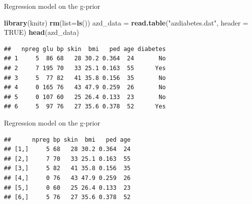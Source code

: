 \documentclass[ignorenonframetext,]{beamer}
\newenvironment{Shaded}{\begin{snugshade}}{\end{snugshade}}
\newcommand{\KeywordTok}[1]{\textcolor[rgb]{0.13,0.29,0.53}{\textbf{#1}}}
\newcommand{\DataTypeTok}[1]{\textcolor[rgb]{0.13,0.29,0.53}{#1}}
\newcommand{\DecValTok}[1]{\textcolor[rgb]{0.00,0.00,0.81}{#1}}
\newcommand{\StringTok}[1]{\textcolor[rgb]{0.31,0.60,0.02}{#1}}
\newcommand{\CommentTok}[1]{\textcolor[rgb]{0.56,0.35,0.01}{\textit{#1}}}
\newcommand{\OtherTok}[1]{\textcolor[rgb]{0.56,0.35,0.01}{#1}}
\newcommand{\OperatorTok}[1]{\textcolor[rgb]{0.81,0.36,0.00}{\textbf{#1}}}
\newcommand{\NormalTok}[1]{#1}
\begin{document}
\begin{frame}[fragile]{Regression model on the g-prior}

\begin{Shaded}
\begin{Highlighting}[]
\KeywordTok{library}\NormalTok{(knitr)}
\KeywordTok{rm}\NormalTok{(}\DataTypeTok{list=}\KeywordTok{ls}\NormalTok{())}
\NormalTok{azd_data =}\StringTok{ }\KeywordTok{read.table}\NormalTok{(}\StringTok{"azdiabetes.dat"}\NormalTok{, }\DataTypeTok{header =} \OtherTok{TRUE}\NormalTok{)}
\KeywordTok{head}\NormalTok{(azd_data)}
\end{Highlighting}
\end{Shaded}

\begin{verbatim}
##   npreg glu bp skin  bmi   ped age diabetes
## 1     5  86 68   28 30.2 0.364  24       No
## 2     7 195 70   33 25.1 0.163  55      Yes
## 3     5  77 82   41 35.8 0.156  35       No
## 4     0 165 76   43 47.9 0.259  26       No
## 5     0 107 60   25 26.4 0.133  23       No
## 6     5  97 76   27 35.6 0.378  52      Yes
\end{verbatim}

\end{frame}

\begin{frame}[fragile]{Regression model on the g-prior}

\begin{Shaded}
\end{Shaded}

\begin{verbatim}
##      npreg bp skin  bmi   ped age
## [1,]     5 68   28 30.2 0.364  24
## [2,]     7 70   33 25.1 0.163  55
## [3,]     5 82   41 35.8 0.156  35
## [4,]     0 76   43 47.9 0.259  26
## [5,]     0 60   25 26.4 0.133  23
## [6,]     5 76   27 35.6 0.378  52
\end{verbatim}

\end{frame}
\end{document}
